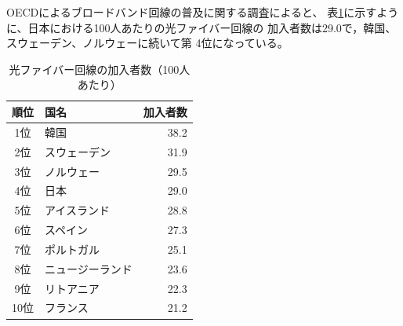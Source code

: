 \documentclass[a4paper,11pt,dvipdfmx]{ujarticle}
\begin{document}
OECDによるブロードバンド回線の普及に関する調査\cite{oecd}によると、
表\ref{hyou}に示すように、日本における100人あたりの光ファイバー回線の
加入者数は29.0で，韓国、スウェーデン、ノルウェーに続いて第
4位になっている。

\begin{table}[htbp]
    \centering
    \caption{光ファイバー回線の加入者数（100人あたり）}
    \label{hyou}

    \begin{tabular}{|c|l|r|}\hline
        順位 & 国名 & 加入者数 \\
        \hline
        1位 & 韓国 & 38.2 \\
        \hline
        2位 & スウェーデン & 31.9 \\
        \hline
        3位 & ノルウェー & 29.5 \\
        \hline
        4位 & 日本 & 29.0 \\
        \hline
        5位 & アイスランド & 28.8 \\
        \hline
        6位 & スペイン & 27.3 \\
        \hline
        7位 & ポルトガル & 25.1 \\
        \hline
        8位 & ニュージーランド & 23.6 \\
        \hline
        9位 & リトアニア & 22.3 \\
        \hline
        10位 & フランス & 21.2 \\
        \hline
        
    \end{tabular}
\end{table}
\end{document}
